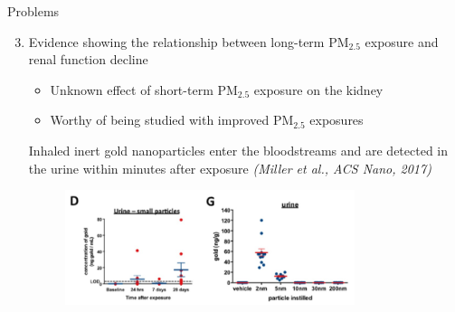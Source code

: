 \documentclass[handout]{beamer} %
\begin{document}
\begin{frame}{Problems}
    \begin{enumerate}
        \setcounter{enumi}{2}
        \item Evidence showing the relationship between long-term PM$_{2.5}$ exposure and renal function decline
            \begin{itemize}
                \item \textcolor[rgb]{1,0.4,0}{Unknown effect of short-term PM$_{2.5}$ exposure on the kidney}
                \item \textcolor[rgb]{1,0.4,0}{Worthy of being studied with improved PM$_{2.5}$ exposures}
            \end{itemize}
        \textcolor[rgb]{0.1,0.1,0.6}{Inhaled inert gold nanoparticles enter the bloodstreams and are detected in the urine within minutes after exposure \textit{\small (Miller et al., ACS Nano, 2017)}}
        \begin{figure}
            \centering
            \includegraphics[width=0.8\textwidth]{img/exposure.jpg}
        \end{figure}
    \end{enumerate}
\end{frame}
\end{document}

